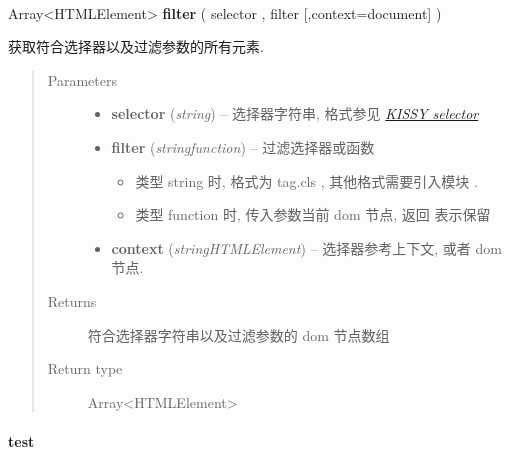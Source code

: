 \documentclass[letterpaper,10pt,english]{sphinxmanual}
\begin{document}
\begin{fulllineitems}
\label{api/core/dom/filter:DOM.filter}~
\begin{DUlineblock}{0em}
\item[] Array\textless{}HTMLElement\textgreater{} \textbf{filter} ( selector , filter {[},context=document{]} )
\item[] 获取符合选择器以及过滤参数的所有元素.
\end{DUlineblock}
\begin{quote}\begin{description}
\item[{Parameters}] \leavevmode\begin{itemize}
\item {}
\textbf{selector} (\emph{string}) -- 选择器字符串, 格式参见 {\hyperref[api/core/dom/selector:dom-selector]{\emph{KISSY selector}}}

\item {}
\textbf{filter} (\emph{string\textbar{}function}) --
过滤选择器或函数
\begin{itemize}
\item {}
类型 string 时, 格式为 tag.cls , 其他格式需要引入模块  .

\item {}
类型 function 时, 传入参数当前 dom 节点, 返回  表示保留

\end{itemize}


\item {}
\textbf{context} (\emph{string\textbar{}HTMLElement}) -- 选择器参考上下文,   或者 dom 节点.

\end{itemize}

\item[{Returns}] \leavevmode
符合选择器字符串以及过滤参数的 dom 节点数组

\item[{Return type}] \leavevmode
Array\textless{}HTMLElement\textgreater{}

\end{description}\end{quote}

\end{fulllineitems}



\paragraph{test}
\label{api/core/dom/test:test}\label{api/core/dom/test::doc}
\end{document}
